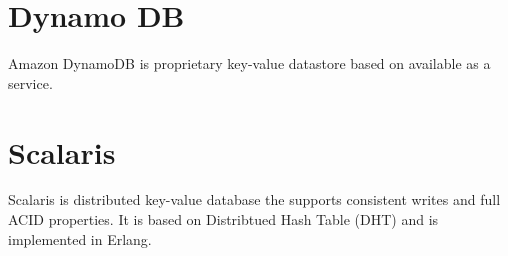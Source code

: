 \section{Dynamo DB}

Amazon DynamoDB \citep{dynamoDB} is proprietary key-value datastore based on
\citet{DeCandia07} available as a service.

\section{Scalaris}

Scalaris \citep{scalaris} is distributed key-value database the supports
consistent writes and full ACID properties. It is based on Distribtued Hash
Table (DHT)%
and is implemented in Erlang.



